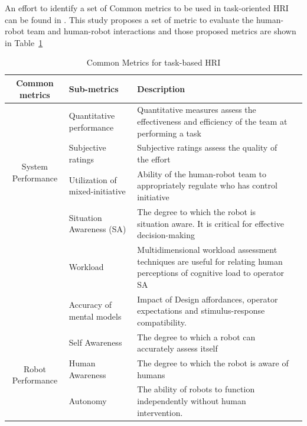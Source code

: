 { An effort to identify a set of Common metrics to be used in task-oriented HRI can be found in \cite{Steinfeld2006}. This study proposes a set of metric to evaluate the human-robot team and human-robot interactions and those proposed metrics are shown in Table~\ref{table:hri_metrics}

\begin{table}[H]
\centering
\small
\caption{Common Metrics for task-based HRI}
\label{table:hri_metrics}
\begin{tabularx}{400pt}{c*3{X}}
\toprule
  \textbf{Common metrics} & \textbf{Sub-metrics} 
                          & \textbf{Description}
  \tabularnewline \midrule
  
  \multirow{4}{*}{System Performance} & Quantitative performance & Quantitative measures assess the
effectiveness and efficiency of the team at performing a task \\
                                      & Subjective ratings & Subjective ratings assess the quality
of the effort \\
                                      & Utilization of mixed-initiative & Ability of the human-robot team to appropriately regulate who has control initiative 
                                          \tabularnewline\midrule
                                          
  \multirow{4}{*}{Operator Performance} & Situation Awareness (SA) & The degree to which the robot is situation aware. It is critical for effective decision-making \\
                                      & Workload & Multidimensional workload assessment techniques are useful for relating human perceptions of cognitive load to operator SA \\
                                      & Accuracy of mental models & Impact of Design affordances, operator expectations and stimulus-response compatibility.
                                          \tabularnewline\midrule
  
  \multirow{4}{*}{Robot Performance} & Self Awareness & The degree to which a robot can accurately
assess itself \\
                                      & Human Awareness & The degree to which the robot is aware of humans \\
                                      & Autonomy & The ability of robots to function independently without human intervention.
                                          \tabularnewline                                
                                         

\end{tabularx}
\end{table}}
